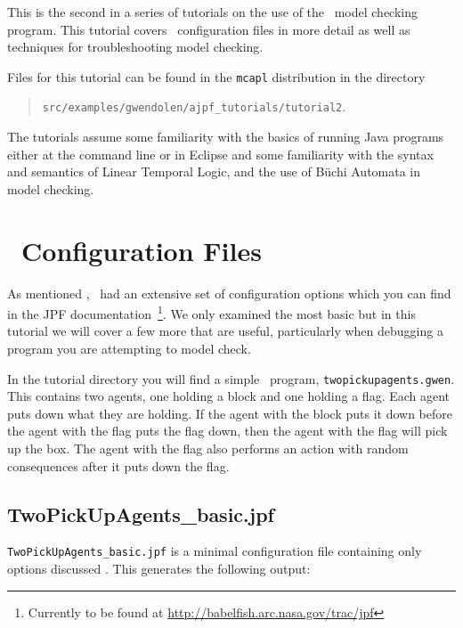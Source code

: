 \label{tutorial:ajpf:troubleshooting}

This is the second in a series of tutorials on the use of the \ajpf\ model checking program.  This tutorial covers \jpf\ configuration files in more detail as well as techniques for troubleshooting model checking.

Files for this tutorial can be found in the \texttt{mcapl} distribution in the directory 
\begin{quote}
\texttt{src/examples/gwendolen/ajpf\_tutorials/tutorial2}.
\end{quote}

The tutorials assume some familiarity with the basics of running Java programs either at the command line or in Eclipse and some familiarity with the syntax and semantics of Linear Temporal Logic, and the use of B\"{u}chi Automata in model checking.

\section{\jpf\ Configuration Files}
As mentioned , \jpf\ had an extensive set of configuration options which you can find in the JPF documentation~\footnote{Currently to be found at \url{http://babelfish.arc.nasa.gov/trac/jpf}}. We only examined the most basic   but in this tutorial we will cover a few more that are useful, particularly when debugging a program you are attempting to model check.

\begin{sloppypar}
In the tutorial directory you will find a simple \gwendolen\ program, \texttt{twopickupagents.gwen}.  This contains two agents, one holding a block and one holding a flag.  Each agent puts down what they are holding.  If the agent with the block puts it down before the agent with the flag puts the flag down, then the agent with the flag will pick up the box.  The agent with the flag also performs an action with random consequences after it puts down the flag.
\end{sloppypar}

\subsection{TwoPickUpAgents\_basic.jpf} \texttt{TwoPickUpAgents\_basic.jpf} is a minimal configuration file containing only options discussed .  This generates the following output:

